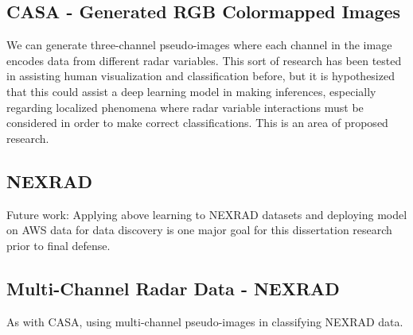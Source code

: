 \subsection{CASA - Generated RGB Colormapped Images}
\label{ssec:classifying_casargbdiscovery}

We can generate three-channel pseudo-images where each channel in the image encodes data from different radar variables.
This sort of research has been tested in assisting human visualization and classification before, but it is hypothesized that this could assist a deep learning model in making inferences, especially regarding localized phenomena where radar variable interactions must be considered in order to make correct classifications.
This is an area of proposed research.

\subsection{NEXRAD}
\label{ssec:classifying_nexraddiscovery}

Future work: Applying above learning to NEXRAD datasets and deploying model on AWS data for data discovery is one major goal for this dissertation research prior to final defense.

\subsection{Multi-Channel Radar Data - NEXRAD}
\label{ssec:classifying_3channelnexrad}

As with CASA, using multi-channel pseudo-images in classifying NEXRAD data.